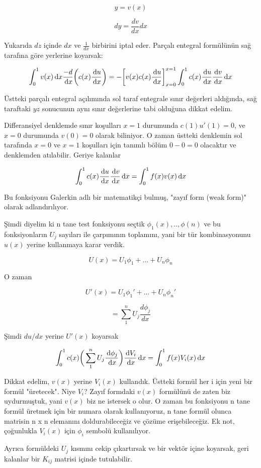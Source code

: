 \documentclass[12pt,fleqn]{article}\usepackage{../../common}
\begin{document}
$$ y = v(x)  $$

$$ dy = \frac{dv}{dx}dx $$

Yukarıda $dz$ içinde $dx$ ve $\frac{1}{dx}$ birbirini iptal eder. Parçalı
entegral formülünün sağ tarafına göre yerlerine koyarsak:

$$
\int_0^1 v(x)\,\mathrm{d} x \frac{-d}{\,\mathrm{d} x} \bigg( c(x) \frac{\,\mathrm{d} u}{\,\mathrm{d} x} \bigg)
= - \bigg[ v(x) c(x) \frac{\,\mathrm{d} u}{\,\mathrm{d} x} \bigg]_{x=0}^{x=1} \int_0^1 c(x) \frac{\,\mathrm{d} u}{\,\mathrm{d} x} \frac{\,\mathrm{d} v}{\,\mathrm{d} x} \,\mathrm{d} x
$$

Üstteki parçalı entegral açılımında sol taraf entegrale sınır
değerleri aldığında, sağ taraftaki $yz$ sonucunun aynı sınır
değerlerine tabi olduğuna dikkat edelim.

Differansiyel denklemde sınır koşulları $x=1$ durumunda $c(1)u'(1)=0$,
ve $x=0$ durumunda $v(0)=0$ olarak biliniyor. O zaman üstteki
denklemin sol tarafında $x=0$ ve $x=1$ koşulları için tanımlı bölüm $0
- 0 = 0$ olacaktır ve denklemden atılabilir. Geriye kalanlar

$$
\int_0^1 c(x) \frac{\,\mathrm{d} u}{\,\mathrm{d} x} \frac{\,\mathrm{d} v}{\,\mathrm{d} x} \,\mathrm{d} x
= \int_0^1 f(x)v(x) \,\mathrm{d} x
$$

Bu fonksiyonu Galerkin adlı bir matematikçi bulmuş, "zayıf form (weak
form)" olarak adlandırılıyor.

Şimdi diyelim ki n tane test fonksiyonu seçtik $\phi_1(x),..,\phi(n)$
ve bu fonksiyonların $U_j$ sayıları ile çarpımının toplamını, yani bir
tür kombinasyonunu $u(x)$ yerine kullanmaya karar verdik.

$$ U(x) = U_1 \phi_1+ ... + U_n\phi_n $$

O zaman

$$ U'(x) = U_1 \phi_1'+ ... + U_n\phi_n' $$

$$ = \sum_1^n U_j \frac{d\phi_j}{dx} $$

Şimdi $du / dx$ yerine $U'(x)$ koyarsak

$$
\int_0^1 c(x) \bigg( \sum_1^n U_j \frac{\,\mathrm{d}\phi_j}{\,\mathrm{d} x}\bigg)
\frac{\,\mathrm{d} V_i}{\,\mathrm{d} x}\,\mathrm{d} x
= \int_0^1 f(x)V_i(x)\,\mathrm{d} x
$$

Dikkat edelim, $v(x)$ yerine $V_i(x)$ kullandık. Üstteki formül her i için yeni
bir formül "üretecek". Niye $V_i$? Zayıf formdaki $v(x)$ formülünü de zaten biz
uydurmuştuk, yani $v(x)$ biz ne istersek o olur. O zaman bu fonksiyonu n tane
formül üretmek için bir numara olarak kullanıyoruz, n tane formül olunca
matrisin n x n elemanını doldurabileceğiz ve çözüme erişebileceğiz. Ek not,
çoğunlukla $V_i(x)$ için $\phi_i$ sembolü kullanılıyor.

Ayrıca formüldeki $U_j$ kısmını cekip çıkartırsak ve bir vektör içine koyarsak,
geri kalanlar bir $K_{ij}$ matrisi içinde tutulabilir. 
\end{document}
